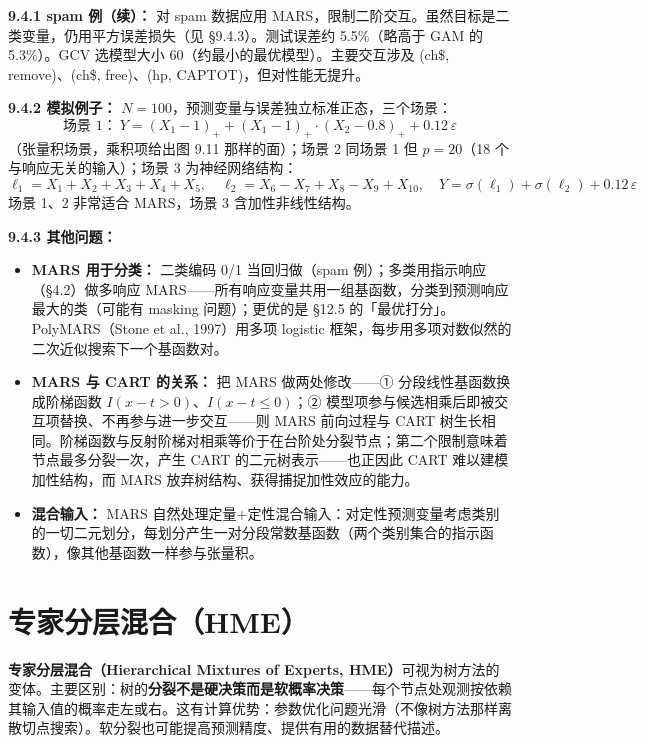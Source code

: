\textbf{9.4.1 spam 例（续）：} 对 spam 数据应用 MARS，限制二阶交互。虽然目标是二类变量，仍用平方误差损失（见 §9.4.3）。测试误差约 5.5\%（略高于 GAM 的 5.3\%）。GCV 选模型大小 60（约最小的最优模型）。主要交互涉及 (ch\$, remove)、(ch\$, free)、(hp, CAPTOT)，但对性能无提升。

\textbf{9.4.2 模拟例子：} $N = 100$，预测变量与误差独立标准正态，三个场景：
\begin{equation}\label{eq:9_21}
    \text{场景 1：}\ Y = (X_1-1)_+ + (X_1-1)_+\cdot(X_2-0.8)_+ + 0.12\,\varepsilon
\end{equation}
（张量积场景，乘积项给出图 9.11 那样的面）；场景 2 同场景 1 但 $p = 20$（18 个与响应无关的输入）；场景 3 为神经网络结构：
\begin{equation}\label{eq:9_22}
    \ell_1 = X_1 + X_2 + X_3 + X_4 + X_5,\quad
    \ell_2 = X_6 - X_7 + X_8 - X_9 + X_{10},\quad 
    Y = \sigma(\ell_1) + \sigma(\ell_2) + 0.12\,\varepsilon
\end{equation}
场景 1、2 非常适合 MARS，场景 3 含加性非线性结构。

\textbf{9.4.3 其他问题：}
\begin{itemize}
    \item \textbf{MARS 用于分类：} 二类编码 0/1 当回归做（spam 例）；多类用指示响应（§4.2）做多响应 MARS——所有响应变量共用一组基函数，分类到预测响应最大的类（可能有 masking 问题）；更优的是 §12.5 的「最优打分」。PolyMARS（Stone et al., 1997）用多项 logistic 框架，每步用多项对数似然的二次近似搜索下一个基函数对。
    \item \textbf{MARS 与 CART 的关系：} 把 MARS 做两处修改——① 分段线性基函数换成阶梯函数 $I(x-t>0)$、$I(x-t\le 0)$；② 模型项参与候选相乘后即被交互项替换、不再参与进一步交互——则 MARS 前向过程与 CART 树生长相同。阶梯函数与反射阶梯对相乘等价于在台阶处分裂节点；第二个限制意味着节点最多分裂一次，产生 CART 的二元树表示——也正因此 CART 难以建模加性结构，而 MARS 放弃树结构、获得捕捉加性效应的能力。
    \item \textbf{混合输入：} MARS 自然处理定量+定性混合输入：对定性预测变量考虑类别的一切二元划分，每划分产生一对分段常数基函数（两个类别集合的指示函数），像其他基函数一样参与张量积。
\end{itemize}

\section{专家分层混合（HME）}

\textbf{专家分层混合（Hierarchical Mixtures of Experts, HME）}可视为树方法的变体。主要区别：树的\textbf{分裂不是硬决策而是软概率决策}——每个节点处观测按依赖其输入值的概率走左或右。这有计算优势：参数优化问题光滑（不像树方法那样离散切点搜索）。软分裂也可能提高预测精度、提供有用的数据替代描述。

